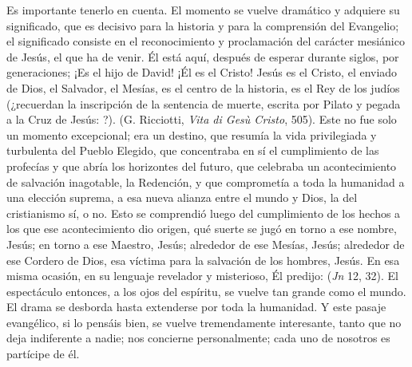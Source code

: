 \begin{body}
Es importante tenerlo en cuenta. El momento se vuelve dramático y adquiere su significado, que es decisivo para la historia y para la comprensión del Evangelio; el significado consiste en el reconocimiento y proclamación del carácter mesiánico de Jesús, el que ha de venir. Él está aquí, después de esperar durante siglos, por generaciones; ¡Es el hijo de David! ¡Él es el Cristo! Jesús es el Cristo, el enviado de Dios, el Salvador, el Mesías, es el centro de la historia, es el Rey de los judíos (¿recuerdan la inscripción de la sentencia de muerte, escrita por Pilato y pegada a la Cruz de Jesús: ?).  (G. Ricciotti, \textit{Vita di Gesù Cristo}, 505). Este no fue solo un momento excepcional; era un destino, que resumía la vida privilegiada y turbulenta del Pueblo Elegido, que concentraba en sí el cumplimiento de las profecías y que abría los horizontes del futuro, que celebraba un acontecimiento de salvación inagotable, la Redención, y que comprometía a toda la humanidad a una elección suprema, a esa nueva alianza entre el mundo y Dios, la del cristianismo sí, o no. Esto se comprendió luego del cumplimiento de los hechos a los que ese acontecimiento dio origen, qué suerte se jugó en torno a ese nombre, Jesús; en torno a ese Maestro, Jesús; alrededor de ese Mesías, Jesús; alrededor de ese Cordero de Dios, esa víctima para la salvación de los hombres, Jesús. En esa misma ocasión, en su lenguaje revelador y misterioso, Él predijo:  (\textit{Jn} 12, 32). El espectáculo entonces, a los ojos del espíritu, se vuelve tan grande como el mundo. El drama se desborda hasta extenderse por toda la humanidad. Y este pasaje evangélico, si lo pensáis bien, se vuelve tremendamente interesante, tanto que no deja indiferente a nadie; nos concierne personalmente; cada uno de nosotros es partícipe de él.


\end{body}
